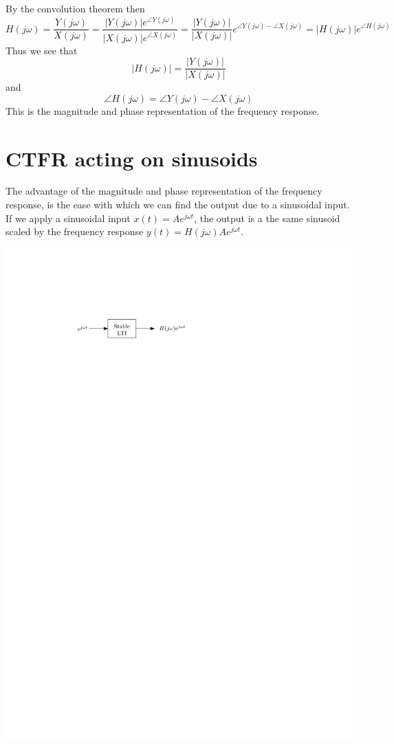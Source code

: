 By the convolution theorem then
  \[
  H(j\omega) = \frac{Y(j\omega)}{X(j\omega)} = \frac{|Y(j\omega)|e^{\angle Y(j\omega)}}{|X(j\omega)|e^{\angle X(j\omega)}} = \frac{|Y(j\omega)|}{|X(j\omega)|}e^{\angle Y(j\omega) - \angle X(j\omega)} = |H(j\omega)|e^{\angle H(j\omega)}
  \]
  Thus we see that
  \[
  |H(j\omega)| = \frac{|Y(j\omega)|}{|X(j\omega)|}
  \]
  and
  \[
  \angle H(j\omega) = \angle Y(j\omega) - \angle X(j\omega)
  \]
  This is the magnitude and phase representation of the frequency response.
  
\section{CTFR acting on sinusoids}

The advantage of the magnitude and phase representation of the frequency response, is the ease with which we can find the output due to a sinusoidal input. If we apply a sinusoidal input $x(t) = A e^{j\omega t}$, the output is a the same sinusoid scaled by the frequency response $y(t) = H(j\omega) A e^{j\omega t}$.

\begin{center}
  \includegraphics[scale=1]{graphics/18-ct-fr.pdf}
\end{center}

